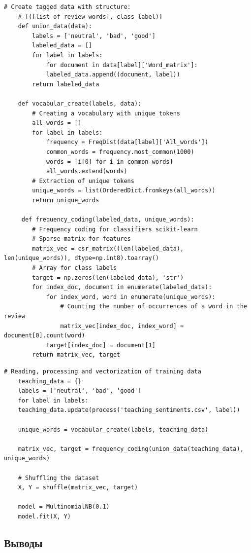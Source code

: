 \documentclass[a4paper,12pt]{article}
\begin{document}
	\begin{lstlisting}[label=lst1,caption=Векторизация]
	# Create tagged data with structure:
	# [([list of review words], class_label)]
	def union_data(data):
		labels = ['neutral', 'bad', 'good']
		labeled_data = []
		for label in labels:
			for document in data[label]['Word_matrix']:
			labeled_data.append((document, label))
		return labeled_data
	
	def vocabular_create(labels, data):
		# Creating a vocabulary with unique tokens
		all_words = [] 
		for label in labels:
			frequency = FreqDist(data[label]['All_words'])
			common_words = frequency.most_common(1000)
			words = [i[0] for i in common_words]
			all_words.extend(words)
		# Extraction of unique tokens
		unique_words = list(OrderedDict.fromkeys(all_words))
		return unique_words
	
	 def frequency_coding(labeled_data, unique_words):
		# Frequency coding for classifiers scikit-learn
		# Sparse matrix for features
		matrix_vec = csr_matrix((len(labeled_data), len(unique_words)), dtype=np.int8).toarray()
		# Array for class labels
		target = np.zeros(len(labeled_data), 'str')
		for index_doc, document in enumerate(labeled_data):
			for index_word, word in enumerate(unique_words):
				# Counting the number of occurrences of a word in the review
				matrix_vec[index_doc, index_word] = document[0].count(word)
			target[index_doc] = document[1]
		return matrix_vec, target
	\end{lstlisting}
	
	\begin{lstlisting}[label=lst2,caption=Обучение модели]
	# Reading, processing and vectorization of training data
	teaching_data = {}
	labels = ['neutral', 'bad', 'good']
	for label in labels:
	teaching_data.update(process('teaching_sentiments.csv', label))
	
	unique_words = vocabular_create(labels, teaching_data)
	
	matrix_vec, target = frequency_coding(union_data(teaching_data), unique_words)
	
	# Shuffling the dataset
	X, Y = shuffle(matrix_vec, target)
	
	model = MultinomialNB(0.1)
	model.fit(X, Y)
	\end{lstlisting}
	
	\subsection*{Выводы}
	
\end{document}
